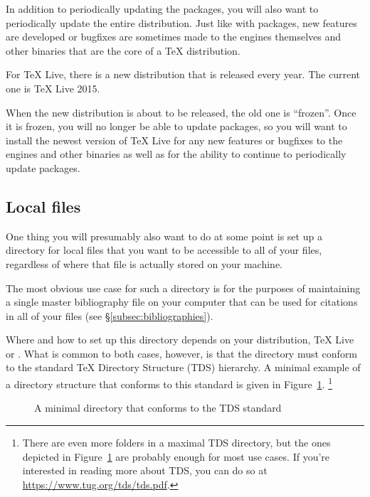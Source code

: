 In addition to periodically updating the packages, you will also want to periodically update the entire distribution.
Just like with packages, new features are developed or bugfixes are sometimes made to the engines themselves and other binaries that are the core of a \TeX{} distribution.

For TeX Live, there is a new distribution that is released every year.
The current one is TeX Live 2015.

When the new distribution is about to be released, the old one is ``frozen''.
Once it is frozen, you will no longer be able to update packages, so you will want to install the newest version of TeX Live for any new features or bugfixes to the engines and other binaries as well as for the ability to continue to periodically update packages.

\subsection{Local files}
\label{subsec:local-files}

One thing you will presumably also want to do at some point is set up a directory for local files that you want to be accessible to all of your  files, regardless of where that  file is actually stored on your machine.

The most obvious use case for such a directory is for the purposes of maintaining a single master bibliography file on your computer that can be used for citations in all of your  files (see \S\ref{subsec:bibliographies}).

Where and how to set up this directory depends on your distribution, TeX Live or .
What is common to both cases, however, is that the directory must conform to the standard \TeX{} Directory Structure (TDS) hierarchy.
A minimal example of a directory structure that conforms to this standard is given in Figure~\ref{fig:TDS}.%
\footnote{%
\label{fn:TDS}%
There are even more folders in a maximal TDS directory, but the ones depicted in Figure~\ref{fig:TDS} are probably enough for most use cases.
If you're interested in reading more about TDS, you can do so at \url{https://www.tug.org/tds/tds.pdf}.%
}

\begin{figure}[htbp]
	\centering
	\caption{A minimal directory that conforms to the TDS standard}
	\label{fig:TDS}
\end{figure}

